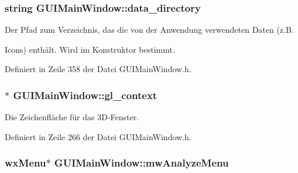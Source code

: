 \hypertarget{classGUIMainWindow_a8f8de1643ce13dec12465486509fd834}{
\subsubsection[{data\-\_\-directory}]{\setlength{\rightskip}{0pt plus 5cm}string G\-U\-I\-Main\-Window\-::data\-\_\-directory\hspace{0.3cm}{\ttfamily [private]}}}\label{classGUIMainWindow_a8f8de1643ce13dec12465486509fd834}


Der Pfad zum Verzeichnis, das die von der Anwendung verwendeten Daten (z.\-B. 

Icons) enthält. Wird im Konstruktor bestimmt. 

Definiert in Zeile 358 der Datei G\-U\-I\-Main\-Window.\-h.

\hypertarget{classGUIMainWindow_a7b5069afb8996ff001654f8d832b2bfa}{
\subsubsection[{gl\-\_\-context}]{$\ast$ G\-U\-I\-Main\-Window\-::gl\-\_\-context\hspace{0.3cm}{\ttfamily [private]}}}\label{classGUIMainWindow_a7b5069afb8996ff001654f8d832b2bfa}


Die Zeichenfläche für das 3\-D-\/\-Fenster. 



Definiert in Zeile 266 der Datei G\-U\-I\-Main\-Window.\-h.

\hypertarget{classGUIMainWindow_ab93a87b5cde10015dc02dc000c409f90}{
\subsubsection[{mw\-Analyze\-Menu}]{\setlength{\rightskip}{0pt plus 5cm}wx\-Menu$\ast$ G\-U\-I\-Main\-Window\-::mw\-Analyze\-Menu\hspace{0.3cm}{\ttfamily [private]}}}\label{classGUIMainWindow_ab93a87b5cde10015dc02dc000c409f90}


